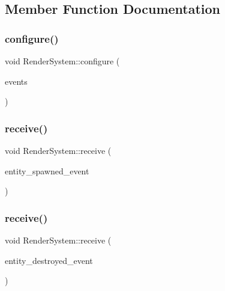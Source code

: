 \subsection{Member Function Documentation}
\mbox{\label{classRenderSystem_a58134d130c3fbb29d5cb59bd0a9480ad}} 
\subsubsection{\texorpdfstring{configure()}{configure()}}
{\footnotesize\ttfamily void Render\+System\+::configure (\begin{DoxyParamCaption}\item[{ex\+::\+Event\+Manager \&}]{events }\end{DoxyParamCaption})\hspace{0.3cm}{\ttfamily [override]}}

\mbox{\label{classRenderSystem_af72a474303dbd088ef9b39983e9f6a64}} 
\subsubsection{\texorpdfstring{receive()}{receive()}\hspace{0.1cm}{\footnotesize\ttfamily [1/2]}}
{\footnotesize\ttfamily void Render\+System\+::receive (\begin{DoxyParamCaption}\item[{const \hyperlink{classEntitySpawnedEvent}{Entity\+Spawned\+Event} \&}]{entity\+\_\+spawned\+\_\+event }\end{DoxyParamCaption})}

\mbox{\label{classRenderSystem_a82e833dc520c9fa822d66b3878c0de69}} 
\subsubsection{\texorpdfstring{receive()}{receive()}\hspace{0.1cm}{\footnotesize\ttfamily [2/2]}}
{\footnotesize\ttfamily void Render\+System\+::receive (\begin{DoxyParamCaption}\item[{const ex\+::\+Entity\+Destroyed\+Event \&}]{entity\+\_\+destroyed\+\_\+event }\end{DoxyParamCaption})}

